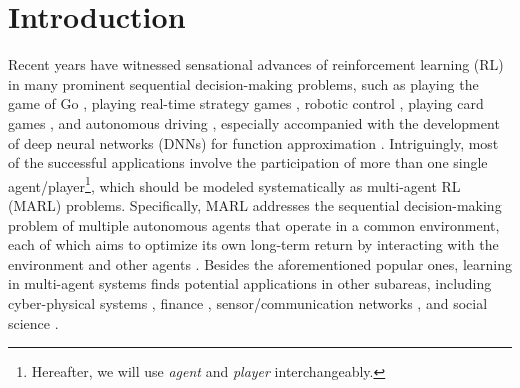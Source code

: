 \section{Introduction}\label{sec:introduction}

Recent years have witnessed sensational advances of   reinforcement learning (RL) in many prominent  sequential  decision-making problems, such as playing the game of Go \cite{silver2016mastering, silver2017mastering}, playing   real-time strategy games  \cite{OpenAI_dota,alphastarblog},   robotic control  \cite{kober2013reinforcement,lillicrap2016continuous}, playing card games \cite{brown2017libratus,brown2019superhuman}, and autonomous driving \cite{shalev2016safe}, especially 
accompanied with  the development of  deep neural networks (DNNs) for function approximation \cite{mnih2015human}.  
Intriguingly, most of the successful applications involve the participation of more than one single agent/player\footnote{Hereafter, we will use \emph{agent} and \emph{player} interchangeably. }, which should be modeled systematically as multi-agent RL (MARL) problems. Specifically, MARL  addresses the sequential decision-making problem of  multiple autonomous  agents that operate in a common environment, each of which aims to optimize its own long-term return by interacting with the environment and other agents \cite{bu2008comprehensive}.  Besides the aforementioned popular ones, learning in multi-agent systems finds potential  applications in other subareas, including cyber-physical systems \cite{adler2002cooperative,wang2016towards}, finance  \cite{lee2002stock,lee2007multiagent}, sensor/communication networks \cite{cortes2004coverage,choi2009distributed}, and social science \cite{castelfranchi2001theory,leibo2017multi}. 

 
 
